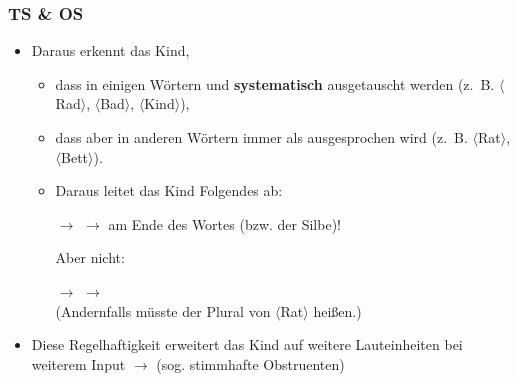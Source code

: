 \begin{frame}
	\frametitle{TS \& OS}
		
\begin{itemize}
	\item Daraus erkennt das Kind,
	
	\begin{itemize}
		\item dass in einigen Wörtern \textipa{[d]} und \textipa{[t]} \textbf{systematisch} ausgetauscht werden (z.~B. $\langle$Rad$\rangle$, $\langle$Bad$\rangle$, $\langle$Kind$\rangle$),
		\item dass aber in anderen Wörtern \textipa{[t]} immer als \textipa{[t]} ausgesprochen wird  (z.~B. $\langle$Rat$\rangle$, $\langle$Bett$\rangle$).
		\item[]
		\item Daraus leitet das Kind Folgendes ab:
		\item[$\rightarrow$]  $\rightarrow$ \textipa{[t]} am Ende des Wortes (bzw. der Silbe)!
		\item[]
		\item[] Aber nicht:
		\item[]
		\item[$\rightarrow$]  $\rightarrow$ \textipa{[d]}\\ (Andernfalls müsste der Plural von $\langle$Rat$\rangle$  heißen.)
	\end{itemize}
	
	\item[]
	\item Diese Regelhaftigkeit erweitert das Kind auf weitere Lauteinheiten bei weiterem Input $\rightarrow$ 	(sog. stimmhafte Obstruenten)
\end{itemize}

\end{frame}
	



